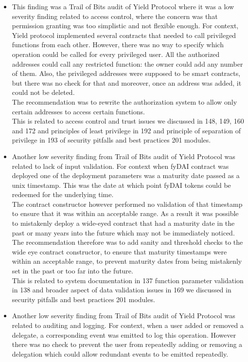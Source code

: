 \begin{itemize}
\item
  This finding was a Trail of Bits audit of Yield Protocol where it was
  a low severity finding related to access control, where the concern
  was that permission granting was too simplistic and not flexible
  enough. For context, Yield protocol implemented several contracts that
  needed to call privileged functions from each other. However, there
  was no way to specify which operation could be called for every
  privileged user. All the authorized addresses could call any
  restricted function: the owner could add any number of them. Also, the
  privileged addresses were supposed to be smart contracts, but there
  was no check for that and moreover, once an address was added, it
  could not be deleted.\\

  The recommendation was to rewrite the authorization system to allow
  only certain addresses to access certain functions.\\

  This is related to access control and trust issues we discussed in
  148, 149, 160 and 172 and principles of least privilege in 192 and
  principle of separation of privilege in 193 of security pitfalls and
  best practices 201 modules.
\item
  Another low severity finding from Trail of Bits audit of Yield
  Protocol was related to lack of input validation. For context when
  fyDAI contract was deployed one of the deployment parameters was a
  maturity date passed as a unix timestamp. This was the date at which
  point fyDAI tokens could be redeemed for the underlying time.\\

  The contract constructor however performed no validation of that
  timestamp to ensure that it was within an acceptable range. As a
  result it was possible to mistakenly deploy a wide-eyed contract that
  had a maturity date in the past or many years into the future which
  may not be immediately noticed.\\

  The recommendation therefore was to add sanity and threshold checks to
  the wide eye contract constructor, to ensure that maturity timestamps
  were within an acceptable range, to prevent maturity dates from being
  mistakenly set in the past or too far into the future.\\

  This is related to system documentation in 137 function parameter
  validation in 138 and broader aspect of data validation issues in 169
  we discussed in security pitfalls and best practices 201 modules.
\item
  Another low severity finding from Trail of Bits audit of Yield
  Protocol was related to auditing and logging. For context, when a user
  added or removed a delegate, a corresponding event was emitted to log
  this operation. However there was no check to prevent the user from
  repeatedly adding or removing a delegation which could allow redundant
  events to be emitted repeatedly.\\


\end{itemize}

